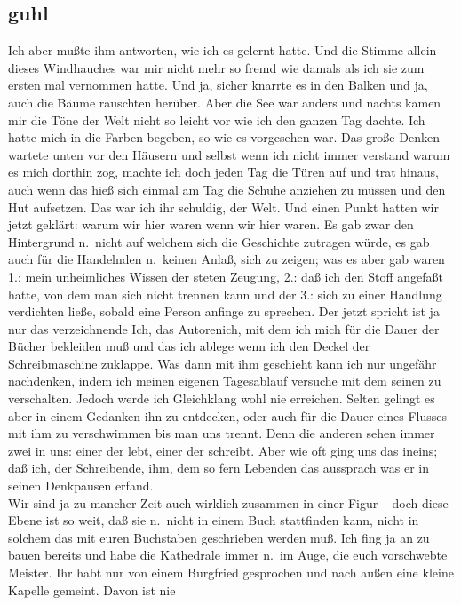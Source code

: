 \documentclass[
]{article}
\author{}
\date{\vspace{-2.5em}}
\begin{document}
\subsection{guhl}\label{guhl}

Ich aber mußte ihm antworten, wie ich es gelernt hatte. Und die Stimme
allein dieses Windhauches war mir nicht mehr so fremd wie damals als ich
sie zum ersten mal vernommen hatte. Und ja, sicher knarrte es in den
Balken und ja, auch die Bäume rauschten herüber. Aber die See war anders
und nachts kamen mir die Töne der Welt nicht so leicht vor wie ich den
ganzen Tag dachte. Ich hatte mich in die Farben begeben, so wie es
vorgesehen war. Das große Denken wartete unten vor den Häusern und
selbst wenn ich nicht immer verstand warum es mich dorthin zog, machte
ich doch jeden Tag die Türen auf und trat hinaus, auch wenn das hieß
sich einmal am Tag die Schuhe anziehen zu müssen und den Hut aufsetzen.
Das war ich ihr schuldig, der Welt. Und einen Punkt hatten wir jetzt
geklärt: warum wir hier waren wenn wir hier waren. Es gab zwar den
Hintergrund n.~nicht auf welchem sich die Geschichte zutragen würde, es
gab auch für die Handelnden n.~keinen Anlaß, sich zu zeigen; was es aber
gab waren 1.: mein unheimliches Wissen der steten Zeugung, 2.: daß ich
den Stoff angefaßt hatte, von dem man sich nicht trennen kann und der
3.: sich zu einer Handlung verdichten ließe, sobald eine Person anfinge
zu sprechen. Der jetzt spricht ist ja nur das verzeichnende Ich, das
Autorenich, mit dem ich mich für die Dauer der Bücher bekleiden muß und
das ich ablege wenn ich den Deckel der Schreibmaschine zuklappe. Was
dann mit ihm geschieht kann ich nur ungefähr nachdenken, indem ich
meinen eigenen Tagesablauf versuche mit dem seinen zu verschalten.
Jedoch werde ich Gleichklang wohl nie erreichen. Selten gelingt es aber
in einem Gedanken ihn zu entdecken, oder auch für die Dauer eines
Flusses mit ihm zu verschwimmen bis man uns trennt. Denn die anderen
sehen immer zwei in uns: einer der lebt, einer der schreibt. Aber wie
oft ging uns das ineins; daß ich, der Schreibende, ihm, dem so fern
Lebenden das aussprach was er in seinen Denkpausen erfand.\\
Wir sind ja zu mancher Zeit auch wirklich zusammen in einer Figur --
doch diese Ebene ist so weit, daß sie n.~nicht in einem Buch stattfinden
kann, nicht in solchem das mit euren Buchstaben geschrieben werden muß.
Ich fing ja an zu bauen bereits und habe die Kathedrale immer n.~im
Auge, die euch vorschwebte Meister. Ihr habt nur von einem Burgfried
gesprochen und nach außen eine kleine Kapelle gemeint. Davon ist nie
\end{document}
